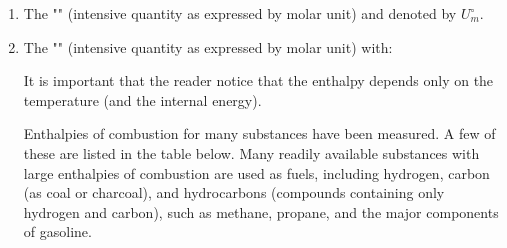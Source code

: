 	\begin{enumerate}
		\item The "" (intensive quantity as expressed by molar unit) and denoted by $U_m^\circ$.

		\item The "" (intensive quantity as expressed by molar unit) with:
		
		It is important that the reader notice that the enthalpy depends only on the temperature (and the internal energy).
		
		Enthalpies of combustion for many substances have been measured. A few of these are listed in the table below. Many readily available substances with large enthalpies of combustion are used as fuels, including hydrogen, carbon (as coal or charcoal), and hydrocarbons (compounds containing only hydrogen and carbon), such as methane, propane, and the major components of gasoline.
		\begin{table}[H]
			\centering
\end{table}
\end{enumerate}
